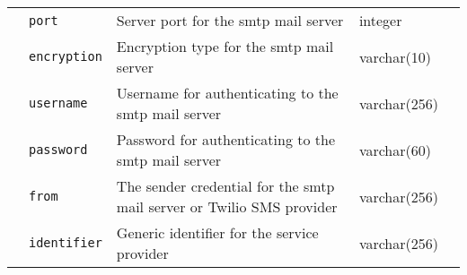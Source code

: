 \begin{landscape}
\begin{longtable}{ | m{} | m{} | m{} | m{} | m{} | }
        \cline{2-5}
                                                                         & \texttt{port}                             & Server port for the \acrshort{smtp} mail server                                                                     & integer       &                               \\
        \cline{2-5}
                                                                         & \texttt{encryption}                       & Encryption type for the \acrshort{smtp} mail server                                                                 & varchar(10)   &                               \\
        \cline{2-5}
                                                                         & \texttt{username}                         & Username for authenticating to the \acrshort{smtp} mail server                                                      & varchar(256)  &                               \\
        \cline{2-5}
                                                                         & \texttt{password}                         & Password for authenticating to the \acrshort{smtp} mail server                                                      & varchar(60)   &                               \\
        \cline{2-5}
                                                                         & \texttt{from}                             & The sender credential for the \acrshort{smtp} mail server or Twilio SMS provider                                    & varchar(256)  &                               \\
        \cline{2-5}
                                                                         & \texttt{identifier}                       & Generic identifier for the service provider                                                                         & varchar(256)  &                               \\


\end{longtable}
\end{landscape}
